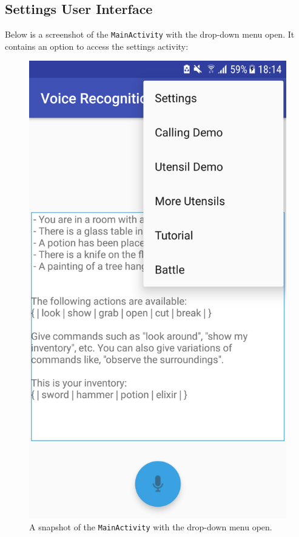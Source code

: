 \documentclass[11pt]{article}
\begin{document}
\begin{appendices}
\newpage
\subsection{Settings User Interface}
\label{appendix:settings}

Below is a screenshot of the \texttt{MainActivity} with the drop-down menu open. It contains an option to access the settings activity:

\begin{figure}[H]
\begin{center}
  \includegraphics[scale=0.25]{drop-down.png}
  \caption{A snapshot of the \texttt{MainActivity} with the drop-down menu open.}
  \label{fig:drop-down-menu}
  \end{center}
\end{figure}


\end{appendices}
\end{document}
